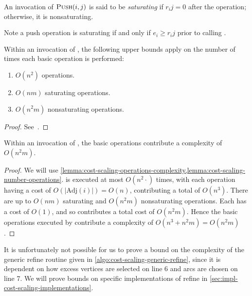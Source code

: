 \begin{defn}
An invocation of $\textproc{Push}(i,j)$ is said to be \emph{saturating} if $r_ij = 0$ after the operation; otherwise, it is nonsaturating.\\
\end{defn}

\begin{remark}
Note a push operation is saturating if and only if $e_i \geq r_ij$ prior to calling .\\
\end{remark}

\begin{lemma} \label{lemma:cost-scaling-number-operations}
Within an invocation of , the following upper bounds apply on the number of times each basic operation is performed:
\begin{enumerate}[label=(\alph*)]
    \item $O(n^2)$  operations.
    \item $O(nm)$ saturating  operations.
    \item $O(n^2m)$ nonsaturating  operations.
\end{enumerate}
\end{lemma}
\begin{proof}
See~\cite[lemma~6.3, lemma~6.4, lemma~6.7]{Goldberg:1987}.
\end{proof}

\begin{thm} \label{thm:cost-scaling-refine-complexity}
Within an invocation of , the basic operations contribute a complexity of $O(n^2m)$.
\end{thm}
\begin{proof}
We will use \cref{lemma:cost-scaling-operations-complexity,lemma:cost-scaling-number-operations}.  is executed at most $O(n^2\cdot)$ times, with each operation having a cost of $O\left(\left|\mathrm{Adj}(i)\right|\right) = O(n)$, contributing a total of $O(n^3)$. There are up to $O(nm)$ saturating and $O(n^2m)$ nonsaturating  operations. Each has a cost of $O(1)$, and so  contributes a total cost of $O(n^2m)$. Hence the basic operations executed by  contribute a complexity of $O(n^3 + n^2m) = O(n^2m)$.
\end{proof}

\begin{remark}
It is unfortunately not possible for us to prove a bound on the complexity of the generic refine routine given in \cref{algo:cost-scaling-generic-refine}, since it is dependent on how excess vertices are selected on line 6 and arcs are chosen on line 7. We will prove bounds on specific implementations of refine in \cref{sec:impl-cost-scaling-implementations}.\\
\end{remark}

